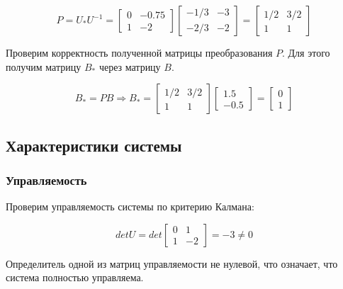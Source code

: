 \documentclass[14pt,a4paper,report]{report}
\begin{document}
\begin{itemize}
	\begin{equation*}
	\text{$P=U_{*}U^{-1}=\begin{bmatrix} 0 & -0.75 \\ 1 & -2 \end{bmatrix}\begin{bmatrix} -1/3 & -3 \\ -2/3 & -2 \end{bmatrix}=\begin{bmatrix} 1/2 & 3/2 \\ 1 & 1 \end{bmatrix}$}
	\end{equation*}
	
	Проверим корректность полученной матрицы преобразования $P$. Для этого получим матрицу $B_{*}$ через матрицу $B$.
	
	\begin{equation*}
	\text{$B_{*}=PB$}
	\Longrightarrow
	\text{$B_{*}=\begin{bmatrix} 1/2 & 3/2 \\ 1 & 1 \end{bmatrix}\begin{bmatrix} 1.5 \\ -0.5 \end{bmatrix}=\begin{bmatrix} 0 \\ 1 \end{bmatrix}$}
	\end{equation*}
		
\end{itemize}

\subsection{Характеристики системы}

\subsubsection{Управляемость}

Проверим управляемость системы по критерию Калмана:

\begin{equation*}
\text{$detU=det\begin{bmatrix} 0 & 1 \\ 1 & -2 \end{bmatrix}=-3\neq 0$}
\end{equation*}

Определитель одной из матриц управляемости не нулевой, что означает, что система полностью управляема.
\end{document}
